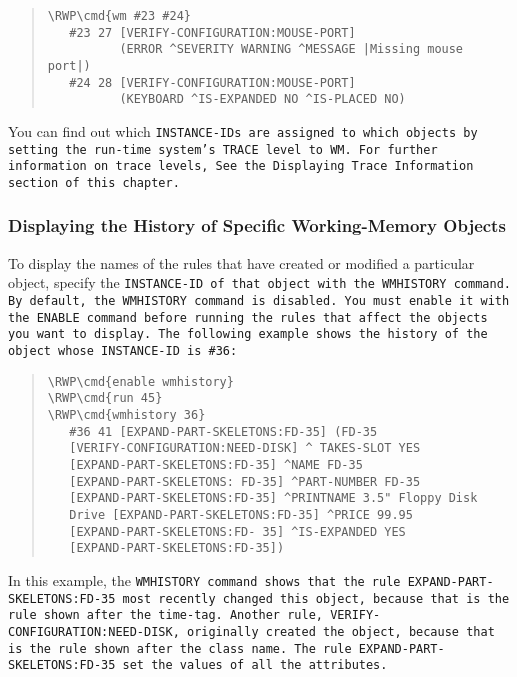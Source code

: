 \begin{quote}
\begin{Verbatim}[commandchars=\\\{\}]
\RWP\cmd{wm #23 #24}
   #23 27 [VERIFY-CONFIGURATION:MOUSE-PORT]
          (ERROR ^SEVERITY WARNING ^MESSAGE |Missing mouse port|)
   #24 28 [VERIFY-CONFIGURATION:MOUSE-PORT]
          (KEYBOARD ^IS-EXPANDED NO ^IS-PLACED NO)
\end{Verbatim}
\end{quote}

You can find out which \tt{INSTANCE-ID}s are assigned to which
objects by setting the run-time system's \tt{TRACE} level to \tt{WM}. For
further information on trace levels, See the Displaying Trace
Information section of this chapter.

\subsubsection{Displaying the History of Specific Working-Memory
  Objects}

To display the names of the rules that have created or modified a
particular object, specify the \tt{INSTANCE-ID} of that object with
the \tt{WMHISTORY} command. By default, the \tt{WMHISTORY} command is
disabled. You must enable it with the \tt{ENABLE} command before
running the rules that affect the objects you want to display.  The
following example shows the history of the object whose
\tt{INSTANCE-ID} is \verb|#36|:

\begin{quote}
\begin{Verbatim}[commandchars=\\\{\}]
\RWP\cmd{enable wmhistory}
\RWP\cmd{run 45}
\RWP\cmd{wmhistory 36}
   #36 41 [EXPAND-PART-SKELETONS:FD-35] (FD-35
   [VERIFY-CONFIGURATION:NEED-DISK] ^ TAKES-SLOT YES
   [EXPAND-PART-SKELETONS:FD-35] ^NAME FD-35
   [EXPAND-PART-SKELETONS: FD-35] ^PART-NUMBER FD-35
   [EXPAND-PART-SKELETONS:FD-35] ^PRINTNAME 3.5" Floppy Disk
   Drive [EXPAND-PART-SKELETONS:FD-35] ^PRICE 99.95
   [EXPAND-PART-SKELETONS:FD- 35] ^IS-EXPANDED YES
   [EXPAND-PART-SKELETONS:FD-35])
\end{Verbatim}
\end{quote}

In this example, the \tt{WMHISTORY} command shows that the rule
\tt{EXPAND-PART-SKELETONS:FD-35} most recently changed this object,
because that is the rule shown after the time-tag. Another rule,
\tt{VERIFY-CONFIGURATION:NEED-DISK}, originally created the object,
because that is the rule shown after the class name. The rule
\tt{EXPAND-PART-SKELETONS:FD-35} set the values of all the attributes.

